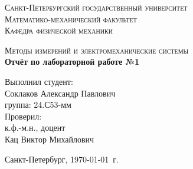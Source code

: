 \begin{titlepage}
\begin{center}
\textsc{Санкт-Петербургский государственный университет\\
Математико-механический факультет\\
Кафедра физической механики\\}

\vfill

\textsc{Методы измерений и электромеханические системы\\[3mm]}
\textbf{\large Отчёт по лабораторной работе №1}

\vfill
\end{center}

\hfill
\begin{minipage}{.5\textwidth}
Выполнил студент:\\[2mm] 
Соклаков Александр Павлович\\
группа: 24.С53-мм\\[5mm]

Проверил:\\[2mm] 
к.ф.-м.н., доцент\\
Кац Виктор Михайлович
\end{minipage}%
\vfill
\begin{center}
Санкт-Петербург, \yeardate\today\ г.
\end{center}
\end{titlepage}